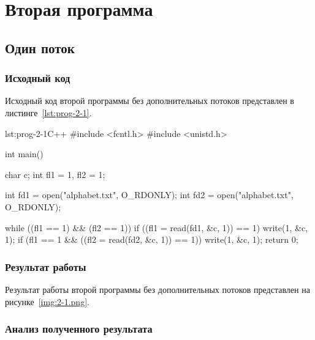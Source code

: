 \section{Вторая программа}
\subsection{Один поток}
\subsubsection{Исходный код}
Исходный код второй программы без дополнительных потоков 
представлен в листинге~\ref{lst:prog-2-1}.

\begin{listing}{lst:prog-2-1}{C++}
#include <fcntl.h>
#include <unistd.h>

int main()
{
    char c;
    int fl1 = 1, fl2 = 1;

    int fd1 = open("alphabet.txt", O_RDONLY);
    int fd2 = open("alphabet.txt", O_RDONLY);

    while ((fl1 == 1) && (fl2 == 1))
    {
        if ((fl1 = read(fd1, &c, 1)) == 1)
            write(1, &c, 1);
        if (fl1 == 1 && ((fl2 = read(fd2, &c, 1)) == 1))
            write(1, &c, 1);
    }
    return 0;
}

\end{listing}

\subsubsection{Результат работы}
Результат работы второй программы без дополнительных потоков 
представлен на рисунке~\ref{img:2-1.png}.

\subsubsection{Анализ полученного результата}


